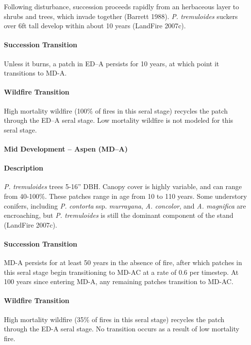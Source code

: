 Following disturbance, succession proceeds rapidly from an herbaceous layer to shrubs and trees, which invade together (Barrett 1988). \emph{P. tremuloides} suckers over 6ft tall develop within about 10 years (LandFire 2007c). 



\paragraph{Succession Transition} Unless it burns, a patch in ED–A persists for 10 years, at which point it transitions to MD-A.

\paragraph{Wildfire Transition} High mortality wildfire (100\% of fires in this seral stage) recycles the patch through the ED–A seral stage. Low mortality wildfire is not modeled for this seral stage.

\noindent\hrulefill


\paragraph{Mid Development – Aspen (MD–A)}

\paragraph{Description} \emph{P. tremuloides} trees 5-16'' DBH. Canopy cover is highly variable, and can range from 40-100\%. These patches range in age from 10 to 110 years. Some understory conifers, including \emph{P. contorta} ssp. \emph{murrayana}, \emph{A. concolor}, and \emph{A. magnifica} are encroaching, but \emph{P. tremuloides} is still the dominant component of the stand (LandFire 2007c).

\paragraph{Succession Transition} MD-A persists for at least 50 years in the absence of fire, after which patches in this seral stage begin transitioning to MD-AC at a rate of 0.6 per timestep. At 100 years since entering MD-A, any remaining patches transition to MD-AC.

\paragraph{Wildfire Transition} High mortality wildfire (35\% of fires in this seral stage) recycles the patch through the ED-A seral stage. No transition occurs as a result of low mortality fire.

